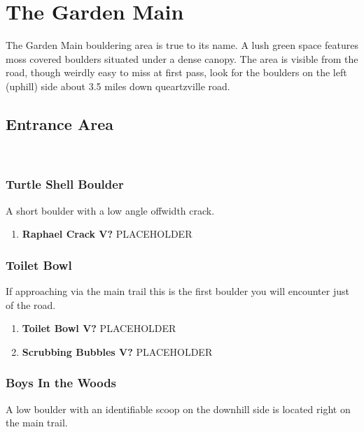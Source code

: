 \chapter{The Garden Main}\label{a:The Garden Main}
\lhead{\textcolor{\chapterColor}{\rule[-2pt]{\textwidth}{15pt}}}
The Garden Main bouldering area is true to its name. A lush green space features moss covered boulders situated under a dense canopy. The area is visible from the road, though weirdly easy to miss at first pass, look for the boulders on the left (uphill) side about 3.5 miles down queartzville road.

\section{Entrance Area}\label{sa:Entrance Area}
\

\subsection*{Turtle Shell Boulder}\label{bf:Turtle Shell Boulder}
A short boulder with a low angle offwidth crack.

\begin{enumerate}[]
	\item\label{rt:Raphael Crack} \colorbox{black!20}{\textbf{Raphael Crack V?  } }
	\newline PLACEHOLDER\
\end{enumerate}
\subsection*{Toilet Bowl}\label{bf:Toilet Bowl}
If approaching via the main trail this is the first boulder you will encounter just of the road.

\begin{enumerate}[resume]
	\item\label{rt:Toilet Bowl} \colorbox{black!20}{\textbf{Toilet Bowl V?  } }
	\newline PLACEHOLDER\
	\item\label{rt:Scrubbing Bubbles} \colorbox{black!20}{\textbf{Scrubbing Bubbles V?  } }
	\newline PLACEHOLDER\
\end{enumerate}
\subsection*{Boys In the Woods}\label{bf:Boys In the Woods}
A low boulder with an identifiable scoop on the downhill side is located right on the main trail.

